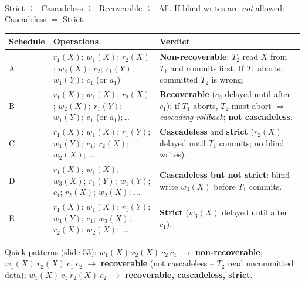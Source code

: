 \documentclass[10pt,a4paper]{article}
\newcommand{\ri}[2]{r_{#1}(#2)}
\newcommand{\wi}[2]{w_{#1}(#2)}
\begin{document}
\begin{center}
\\
{\small Strict $\subseteq$ Cascadeless $\subseteq$ Recoverable $\subseteq$ All. \; If blind writes are \emph{not} allowed: Cascadeless $=$ Strict.}
\end{center}

\begin{exbox}
\small
\begin{tabularx}{\linewidth}{@{}l X X@{}}
\toprule
\textbf{Schedule} & \textbf{Operations} & \textbf{Verdict}\\\midrule
A & $\ri1X$; $\wi1X$; $\ri2X$; $\wi2X$; $c_2$; $\ri1Y$; $\wi1Y$; $c_1$ (or $a_1$) & \textbf{Non-recoverable}: $T_2$ read $X$ from $T_1$ and commits first. If $T_1$ aborts, committed $T_2$ is wrong.\\
B & $\ri1X$; $\wi1X$; $\ri2X$; $\wi2X$; $\ri1Y$; $\wi1Y$; $c_1$ (or $a_1$)$; $\dots & \textbf{Recoverable} ($c_2$ delayed until after $c_1$); if $T_1$ aborts, $T_2$ must abort $\Rightarrow$ \emph{cascading rollback}; \textbf{not cascadeless}.\\
C & $\ri1X$; $\wi1X$; $\ri1Y$; $\wi1Y$; $c_1$; $\ri2X$; $\wi2X$; $\dots$ & \textbf{Cascadeless} and \textbf{strict} ($r_2(X)$ delayed until $T_1$ commits; no blind writes).\\
D & $\ri1X$; $\wi1X$; $\wi3X$; $\ri1Y$; $\wi1Y$; $c_1$; $\ri2X$; $\wi2X$; $\dots$ & \textbf{Cascadeless but not strict}: blind write $w_3(X)$ before $T_1$ commits.\\
E & $\ri1X$; $\wi1X$; $\ri1Y$; $\wi1Y$; $c_1$; $\wi3X$; $\ri2X$; $\wi2X$; $\dots$ & \textbf{Strict} ($w_3(X)$ delayed until after $c_1$).\\
\bottomrule
\end{tabularx}

\vspace{3pt}
Quick patterns (slide 53):\;
$w_1(X)\ r_2(X)\ c_2\ c_1$ $\to$ \textbf{non-recoverable};\;
$w_1(X)\ r_2(X)\ c_1\ c_2$ $\to$ \textbf{recoverable} (not cascadeless -- $T_2$ read uncommitted data);\;
$w_1(X)\ c_1\ r_2(X)\ c_2$ $\to$ \textbf{recoverable, cascadeless, strict}.
\end{exbox}
\end{document}
